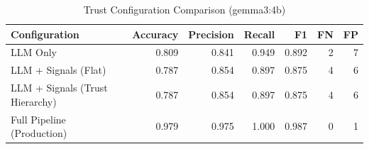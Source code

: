 \begin{table}[h]
\centering
\caption{Trust Configuration Comparison (gemma3:4b)}
\label{tab:e6_config_comparison}
\begin{tabular}{l r r r r r r}
\hline
Configuration & Accuracy & Precision & Recall & F1 & FN & FP \\
\hline
LLM Only & 0.809 & 0.841 & 0.949 & 0.892 & 2 & 7 \\
LLM + Signals (Flat) & 0.787 & 0.854 & 0.897 & 0.875 & 4 & 6 \\
LLM + Signals (Trust Hierarchy) & 0.787 & 0.854 & 0.897 & 0.875 & 4 & 6 \\
Full Pipeline (Production) & 0.979 & 0.975 & 1.000 & 0.987 & 0 & 1 \\
\hline
\end{tabular}
\end{table}